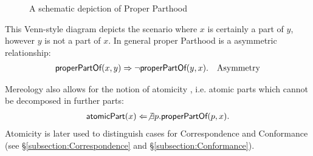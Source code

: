 \begin{figure}[h!]
\begin{center}
\end{center}
\caption{A schematic depiction of Proper Parthood}
\label{figure:SchematicProperPart}
\end{figure}
This Venn-style diagram depicts the scenario where $x$ is certainly a part of $y$, however $y$ is not a part of $x$.
In general proper \gls{Parthood} is a asymmetric relationship:
\begin{align*}
&\textsf{properPartOf}(x,y) 
\Rightarrow
\neg \textsf{properPartOf}(y,x).
&\text{Asymmetry}
\end{align*}

\Gls{Mereology} also allows for the notion of atomicity \cite{DBLP:journals/dke/Varzi96} \cite{SEP:Mereology}, i.e. atomic parts which cannot be decomposed in further parts:
\begin{align*}
\textsf{atomicPart}(x)
\Leftarrow
\not \exists p.\textsf{properPartOf}(p,x).
\end{align*}
Atomicity is later used to distinguish cases for \gls{Correspondence} and \gls{Conformance} (see §\ref{subsection:Correspondence} and §\ref{subsection:Conformance}).

